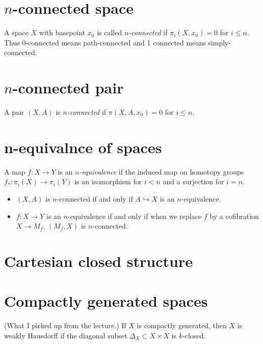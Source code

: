 \section{\texorpdfstring{$n$}{n}-connected
space}
\label{section-n-connected-space}

A space $X$ with basepoint $x_0$ is called
{\it $n$-connected} if $\pi_i(X,x_0)=0$ for
$i\leq n$. Thus 0-connected means
path-connected and 1 connected means
simply-connected.

\section{\texorpdfstring{$n$}{n}-connected
pair}
\label{section-n-connected-pair}

A pair $(X,A)$ is {\it $n$-connected} if
$\pi(X,A,x_0)=0$ for $i\leq n$.

\section{n-equivalnce of spaces}
\label{section-n-equivalence-of-spaces}

A map $f:X\to Y$ is an {\it  $n$-equivalence}
if the induced map on homotopy groups
$f_{*}:\pi_{i}(X)\to \pi_{i}(Y)$ is an
isomorphism for $i<n$ and a surjection for
$i=n$.

\begin{remark}
\label{remark-what-i-picke-up-lectu-if}
\begin{itemize}
\item $(X,A)$ is $n$-connected if and only if
$A\hookrightarrow X$ is an $n$-equivalence.
\item $f:X\to Y$ is an $n$-equivalence if and
only if when we replace $f$ by a cofibration
$X\to M_{f}$, $(M_{f},X)$ is $n$-connected.
\end{itemize}
\end{remark}

\section{Cartesian closed structure}
\label{section-Cartesian-closed-structure}

\section{Compactly generated spaces}
\label{section-compactly-generated-spaces}

(What I picked up from the lecture.) If $X$
is compactly generated, then $X$ is
weakly Hausdorff if the diagonal subset
$\Delta_X\subset X\times X$ is
$k$-closed.

